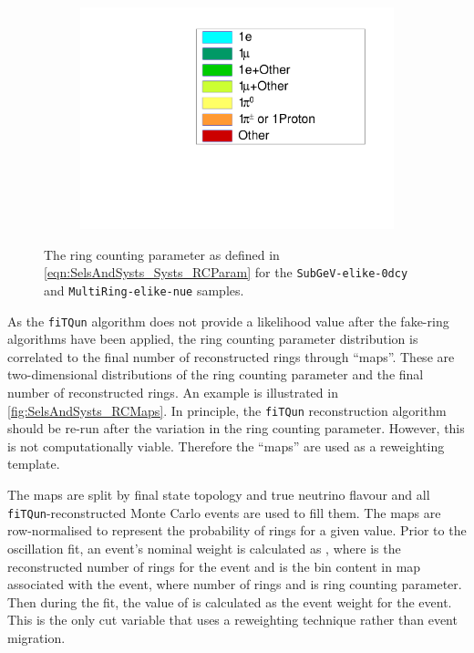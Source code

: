 \begin{figure}[h]
\begin{subfigure}[t]{0.49\textwidth}
    \includegraphics[width=\textwidth, trim={0mm 0mm 0mm 0mm}, clip,page=1]{Figures/Selections/RCParameterLegend.pdf}
  \end{subfigure}
  \caption{The ring counting parameter as defined in \autoref{eqn:SelsAndSysts_Systs_RCParam} for the \texttt{SubGeV-elike-0dcy} and \texttt{MultiRing-elike-nue} samples.}
  \label{fig:SelsAndSysts_RCParameterDistribution}
\end{figure}

As the \texttt{fiTQun} algorithm does not provide a likelihood value after the fake-ring algorithms have been applied, the ring counting parameter distribution is correlated to the final number of reconstructed rings through ``maps''. These are two-dimensional distributions of the ring counting parameter and the final number of reconstructed rings. An example is illustrated in \autoref{fig:SelsAndSysts_RCMaps}. In principle, the \texttt{fiTQun} reconstruction algorithm should be re-run after the variation in the ring counting parameter. However, this is not computationally viable. Therefore the ``maps'' are used as a reweighting template.

The maps are split by final state topology and true neutrino flavour and all \texttt{fiTQun}-reconstructed Monte Carlo events are used to fill them. The maps are row-normalised to represent the probability of  rings for a given  value. Prior to the oscillation fit, an event's nominal weight is calculated as , where  is the reconstructed number of rings for the  event and  is the bin content in map associated with the  event, where  number of rings and  is ring counting parameter. Then during the fit, the value of  is calculated as the event weight for the  event. This is the only cut variable that uses a reweighting technique rather than event migration.


